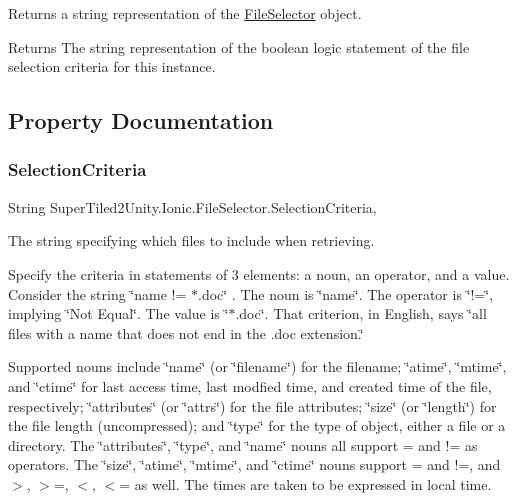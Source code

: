 Returns a string representation of the \mbox{\hyperlink{class_super_tiled2_unity_1_1_ionic_1_1_file_selector}{File\+Selector}} object. 

\begin{DoxyReturn}{Returns}
The string representation of the boolean logic statement of the file selection criteria for this instance. 
\end{DoxyReturn}


\subsection{Property Documentation}
\mbox{\label{class_super_tiled2_unity_1_1_ionic_1_1_file_selector_a0f2d26f8fb39862f504bc0069365ff39}} 
\subsubsection{\texorpdfstring{Selection\+Criteria}{SelectionCriteria}}
{\footnotesize\ttfamily String Super\+Tiled2\+Unity.\+Ionic.\+File\+Selector.\+Selection\+Criteria\hspace{0.3cm}{\ttfamily [get]}, {\ttfamily [set]}}



The string specifying which files to include when retrieving. 

Specify the criteria in statements of 3 elements\+: a noun, an operator, and a value. Consider the string \char`\"{}name != $\ast$.\+doc\char`\"{} . The noun is \char`\"{}name\char`\"{}. The operator is \char`\"{}!=\char`\"{}, implying \char`\"{}\+Not Equal\char`\"{}. The value is \char`\"{}$\ast$.\+doc\char`\"{}. That criterion, in English, says \char`\"{}all files with a name that
  does not end in the .\+doc extension.\char`\"{} 

Supported nouns include \char`\"{}name\char`\"{} (or \char`\"{}filename\char`\"{}) for the filename; \char`\"{}atime\char`\"{}, \char`\"{}mtime\char`\"{}, and \char`\"{}ctime\char`\"{} for last access time, last modfied time, and created time of the file, respectively; \char`\"{}attributes\char`\"{} (or \char`\"{}attrs\char`\"{}) for the file attributes; \char`\"{}size\char`\"{} (or \char`\"{}length\char`\"{}) for the file length (uncompressed); and \char`\"{}type\char`\"{} for the type of object, either a file or a directory. The \char`\"{}attributes\char`\"{}, \char`\"{}type\char`\"{}, and \char`\"{}name\char`\"{} nouns all support = and != as operators. The \char`\"{}size\char`\"{}, \char`\"{}atime\char`\"{}, \char`\"{}mtime\char`\"{}, and \char`\"{}ctime\char`\"{} nouns support = and !=, and $>$, $>$=, $<$, $<$= as well. The times are taken to be expressed in local time. 

